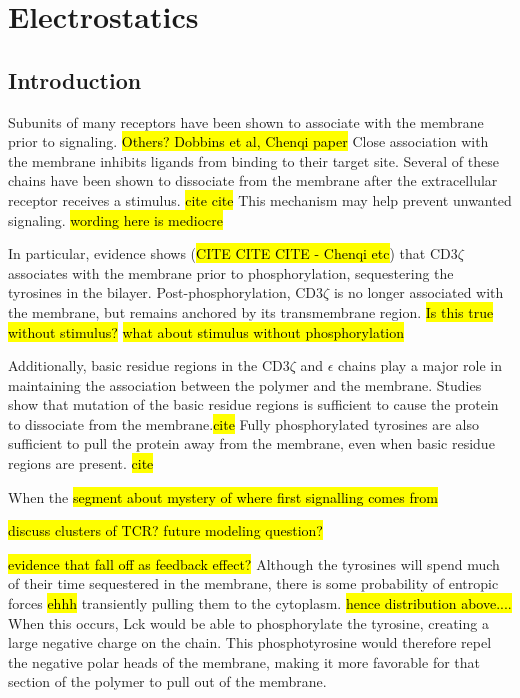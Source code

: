 \documentclass[../../AdvancementSummary.tex]{subfiles}
\begin{document}
\section{Electrostatics}

\subsection{Introduction}

Subunits of many receptors have been shown to associate with the membrane prior to signaling. \hl{Others?  Dobbins et al, Chenqi paper} Close association with the membrane inhibits ligands from binding to their target site. Several of these chains have been shown to dissociate from the membrane after the extracellular receptor receives a stimulus. \hl{cite cite} This mechanism may help prevent unwanted signaling. \hl{wording here is mediocre}

In particular, evidence shows (\hl{CITE CITE CITE - Chenqi etc}) that CD3$\zeta$ associates with the membrane prior to phosphorylation, sequestering the tyrosines in the bilayer. Post-phosphorylation, CD3$\zeta$ is no longer associated with the membrane, but remains anchored by its transmembrane region. \hl{Is this true without stimulus?} \hl{what about stimulus without phosphorylation}

Additionally, basic residue regions in the CD3$\zeta$ and $\epsilon$ chains play a major role in maintaining the association between the polymer and the membrane. Studies show that mutation of the basic residue regions is sufficient to cause the protein to dissociate from the membrane.\hl{cite} Fully phosphorylated tyrosines are also sufficient to pull the protein away from the membrane, even when basic residue regions are present. \hl{cite} 

When the \hl{segment about mystery of where first signalling comes from}

\hl{discuss clusters of TCR? future modeling question?}

\hl{evidence that fall off as feedback effect?} Although the tyrosines will spend much of their time sequestered in the membrane, there is some probability of entropic forces \hl{ehhh} transiently pulling them to the cytoplasm. \hl{hence distribution above....} When this occurs, Lck would be able to phosphorylate the tyrosine, creating a large negative charge on the chain. This phosphotyrosine would therefore repel the negative polar heads of the membrane, making it more favorable for that section of the polymer to pull out of the membrane.  
\end{document}
